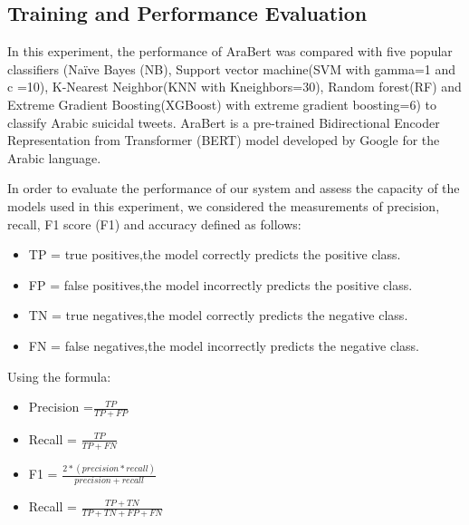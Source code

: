 \documentclass[11pt]{article}
\begin{document}
\subsection{Training and Performance Evaluation}%
In this experiment, the performance of AraBert was compared with five popular classifiers (Naïve Bayes (NB), Support vector machine(SVM with gamma=1 and c =10), K-Nearest Neighbor(KNN with Kneighbors=30), Random forest(RF) and Extreme Gradient Boosting(XGBoost) with extreme gradient boosting=6) to classify Arabic suicidal tweets. AraBert is a pre-trained Bidirectional Encoder Representation from Transformer (BERT) model developed by Google for the Arabic language.\cite{berthttps://doi.org/10.48550/arxiv.1810.04805}


In order to evaluate the performance of our system and assess the capacity of the models used in this experiment, we considered the measurements of precision, recall, F1 score (F1) and accuracy defined as follows:



\begin{itemize}
    \item TP = true positives,the model correctly predicts the positive class.
    \item FP = false positives,the model incorrectly predicts the positive class.
    \item TN = true negatives,the model correctly predicts the negative class.
    \item FN = false negatives,the model incorrectly predicts the negative class.
\end{itemize}

Using the formula:
\begin{itemize}
    \item Precision =$\frac{TP}{TP+FP}$%
    
    \item Recall = $\frac{TP}{TP+FN}$%
    
    \item F1 = $\frac{2*(precision * recall)}{precision + recall}$%

    \item Recall = $\frac{TP+TN}{TP+TN+FP+FN}$%
\end{itemize}
\end{document}

